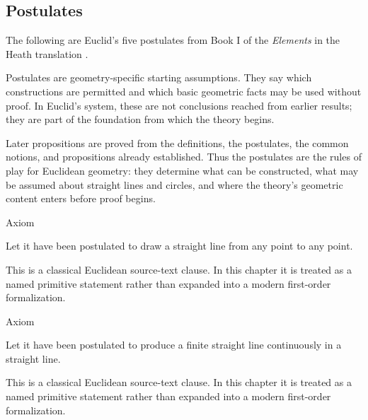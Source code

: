\subsection*{Postulates}

\begin{remark*}
The following are Euclid's five postulates from Book I of the
\textit{Elements} in the Heath translation
\citep[Book I, Postulates 1--5]{euclid-elements-heath}.
\end{remark*}

\begin{remark*}[Exposition]
Postulates are geometry-specific starting assumptions. They say which
constructions are permitted and which basic geometric facts may be used without
proof. In Euclid's system, these are not conclusions reached from earlier
results; they are part of the foundation from which the theory begins.

Later propositions are proved from the definitions, the postulates, the common
notions, and propositions already established. Thus the postulates are the
rules of play for Euclidean geometry: they determine what can be constructed,
what may be assumed about straight lines and circles, and where the theory's
geometric content enters before proof begins.
\end{remark*}

\begin{axiombox}{Axiom}
\begin{axiom}
\label{ax:euclid-postulate-draw-straight-line}
Let it have been postulated to draw a straight line from any point to any point.
\end{axiom}
\end{axiombox}
\begin{remark*}
This is a classical Euclidean source-text clause. In this chapter it is treated
as a named primitive statement rather than expanded into a modern first-order
formalization.
\end{remark*}

\begin{lra-not-visible}
\NoLocalDependencies
\end{lra-not-visible}

\begin{axiombox}{Axiom}
\begin{axiom}
\label{ax:euclid-postulate-produce-straight-line}
Let it have been postulated to produce a finite straight line continuously in a
straight line.
\end{axiom}
\end{axiombox}
\begin{remark*}
This is a classical Euclidean source-text clause. In this chapter it is treated
as a named primitive statement rather than expanded into a modern first-order
formalization.
\end{remark*}

